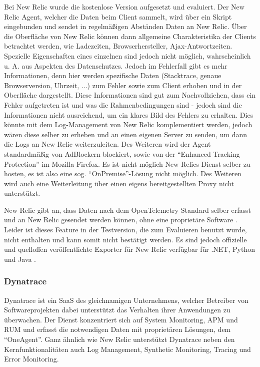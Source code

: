 
Bei New Relic wurde die kostenlose Version aufgesetzt und evaluiert. Der New Relic Agent, welcher die Daten beim Client sammelt, wird über ein Skript eingebunden und sendet in regelmäßigen Abständen Daten an New Relic. Über die Oberfläche von New Relic können dann allgemeine Charakteristika der Clients betrachtet werden, wie Ladezeiten, Browserhersteller, Ajax-Antwortzeiten. Spezielle Eigenschaften eines einzelnen sind jedoch nicht möglich, wahrscheinlich u. A. aus Aspekten des Datenschutzes. Jedoch im Fehlerfall gibt es mehr Informationen, denn hier werden spezifische Daten (Stacktrace, genaue Browserversion, Uhrzeit, ...) zum Fehler sowie zum Client erhoben und in der Oberfläche dargestellt. Diese Informationen sind gut zum Nachvollziehen, dass ein Fehler aufgetreten ist und was die Rahmenbedingungen sind - jedoch sind die Informationen nicht ausreichend, um ein klares Bild des Fehlers zu erhalten. Dies könnte mit dem Log-Management von New Relic komplementiert werden, jedoch wären diese selber zu erheben und an einen eigenen Server zu senden, um dann die Logs an New Relic weiterzuleiten. Des Weiteren wird der Agent standardmäßig von AdBlockern blockiert, sowie von der \enquote{Enhanced Tracking Protection} im Mozilla Firefox. Es ist nicht möglich New Relics Dienst selber zu hosten, es ist also eine sog. \enquote{OnPremise}-Lösung nicht möglich. Des Weiteren wird auch eine Weiterleitung über einen eigens bereitgestellten Proxy nicht unterstützt.

New Relic gibt an, dass Daten nach dem OpenTelemetry Standard selber erfasst und an New Relic gesendet werden können, ohne eine proprietäre Software \cite{NewRelicAnnoundOTelBetaSupport}. Leider ist dieses Feature in der Testversion, die zum Evaluieren benutzt wurde, nicht enthalten und kann somit nicht bestätigt werden. Es sind jedoch offizielle und quelloffen veröffentlichte Exporter für New Relic verfügbar für .NET, Python und Java \cite{OpenTelemetryRegistry}.

\subsubsection{Dynatrace}

Dynatrace \cite{Dynatrace} ist ein SaaS des gleichnamigen Unternehmens, welcher Betreiber von Softwareprojekten dabei unterstützt das Verhalten ihrer Anwendungen zu überwachen. Der Dienst konzentriert sich auf System Monitoring, APM und RUM und erfasst die notwendigen Daten mit proprietären Lösungen, dem \enquote{OneAgent}. Ganz ähnlich wie New Relic unterstützt Dynatrace neben den Kernfunktionalitäten auch Log Management, Synthetic Monitoring, Tracing und Error Monitoring.

